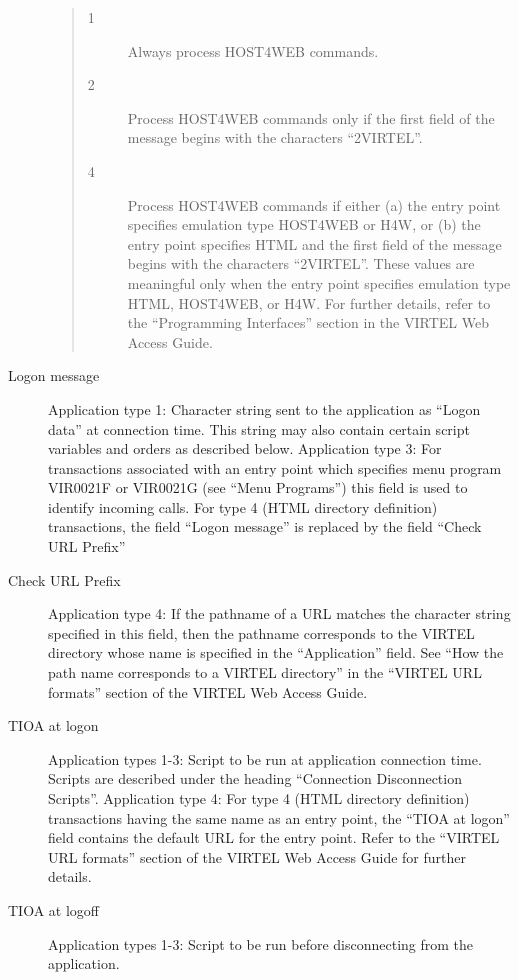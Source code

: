 \documentclass[letterpaper,10pt,english]{sphinxmanual}
\begin{document}
\begin{description}
\begin{quote}
\begin{description}
\item[{1}] \leavevmode
Always process HOST4WEB commands.

\item[{2}] \leavevmode
Process HOST4WEB commands only if the first field of the message begins with the characters “2VIRTEL”.

\item[{4}] \leavevmode
Process HOST4WEB commands if either (a) the entry point specifies emulation type HOST4WEB or H4W, or (b) the entry point specifies HTML and the first field of the message begins with the characters “2VIRTEL”.
These values are meaningful only when the entry point specifies emulation type HTML, HOST4WEB, or H4W. For further details, refer to the “Programming Interfaces” section in the VIRTEL Web Access Guide.

\end{description}
\end{quote}

\item[{Logon message}] \leavevmode
Application type 1: Character string sent to the application as “Logon data” at connection time. This string may also contain certain script variables and orders as described below.
Application type 3: For transactions associated with an entry point which specifies menu program VIR0021F or VIR0021G (see “Menu Programs”) this field is used to identify incoming calls. For type 4 (HTML directory definition) transactions, the field “Logon message” is replaced by the field “Check URL Prefix”

\item[{Check URL Prefix}] \leavevmode
Application type 4: If the pathname of a URL matches the character string specified in this field, then the pathname corresponds to the VIRTEL directory whose name is specified in the “Application” field. See “How the path name corresponds to a VIRTEL directory” in the “VIRTEL URL formats” section of the VIRTEL Web Access Guide.

\item[{TIOA at logon}] \leavevmode
Application types 1-3: Script to be run at application connection time. Scripts are described under the heading “Connection \textendash{} Disconnection Scripts”. Application type 4: For type 4 (HTML directory definition) transactions having the same name as an entry point, the “TIOA at logon” field contains the default URL for the entry point. Refer to the “VIRTEL URL formats” section of the VIRTEL Web Access Guide for further details.

\item[{TIOA at logoff}] \leavevmode
Application types 1-3: Script to be run before disconnecting from the application.

\end{description}
\end{document}
